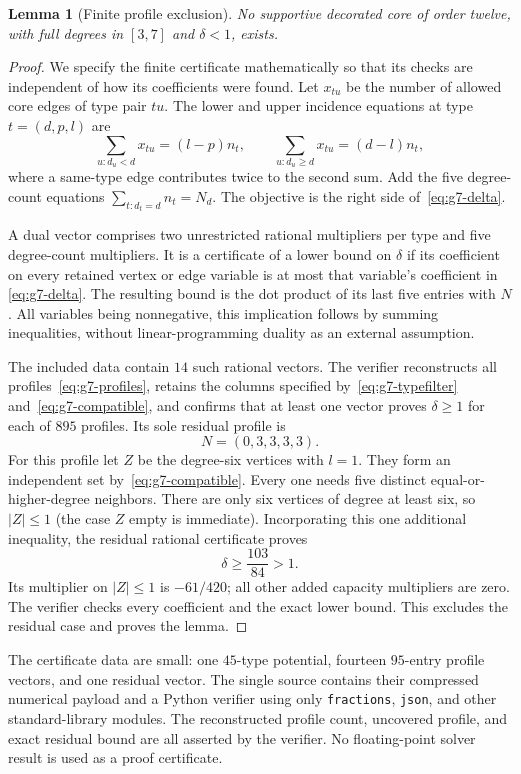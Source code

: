 \documentclass[11pt,a4paper]{article}
\newtheorem{lemma}[theorem]{Lemma}
\theoremstyle{definition}\newtheorem{definition}[theorem]{Definition}
\theoremstyle{remark}\newtheorem{remark}[theorem]{Remark}
\begin{document}
\begin{lemma}[Finite profile exclusion]\label{lem:g7-profiles}
No supportive decorated core of order twelve, with full degrees in
$[3,7]$ and $\delta<1$, exists.
\end{lemma}
\begin{proof}
We specify the finite certificate mathematically so that its checks
are independent of how its coefficients were found. Let $x_{tu}$ be
the number of allowed core edges of type pair $tu$. The lower and
upper incidence equations at type $t=(d,p,l)$ are
\[
 \sum_{u:d_u<d}x_{tu}=(l-p)n_t,
 \qquad
 \sum_{u:d_u\ge d}x_{tu}=(d-l)n_t,
\]
where a same-type edge contributes twice to the second sum. Add the
five degree-count equations $\sum_{t:d_t=d}n_t=N_d$.
The objective is the right side of~\eqref{eq:g7-delta}.

A dual vector comprises two unrestricted rational multipliers per
type and five degree-count multipliers. It is a certificate of a
lower bound on $\delta$ if its coefficient on every retained vertex
or edge variable is at most that variable's coefficient in
\eqref{eq:g7-delta}. The resulting bound is the dot product of its
last five entries with $N$. All variables being nonnegative, this
implication follows by summing inequalities, without linear-programming
duality as an external assumption.

The included data contain $14$ such rational vectors. The verifier
reconstructs all profiles~\eqref{eq:g7-profiles}, retains the columns
specified by~\eqref{eq:g7-typefilter} and~\eqref{eq:g7-compatible},
and confirms that at least one vector proves $\delta\ge1$ for each
of $895$ profiles. Its sole residual profile is
\[
 N=(0,3,3,3,3).
\]
For this profile let $Z$ be the degree-six vertices with $l=1$.
They form an independent set by~\eqref{eq:g7-compatible}. Every one
needs five distinct equal-or-higher-degree neighbors. There are only
six vertices of degree at least six, so $|Z|\le1$ (the case $Z$ empty
is immediate). Incorporating this one additional inequality, the
residual rational certificate proves
\[
 \delta\ge\frac{103}{84}>1.
\]
Its multiplier on $|Z|\le1$ is $-61/420$; all other added capacity
multipliers are zero. The verifier checks every coefficient and the
exact lower bound. This excludes the residual case and proves the
lemma.
\end{proof}

The certificate data are small: one $45$-type potential, fourteen
$95$-entry profile vectors, and one residual vector. The single source
contains their compressed numerical payload and a Python verifier
using only \texttt{fractions}, \texttt{json}, and other standard-library
modules. The reconstructed profile count, uncovered profile, and exact
residual bound are all asserted by the verifier. No floating-point
solver result is used as a proof certificate.
\end{document}
